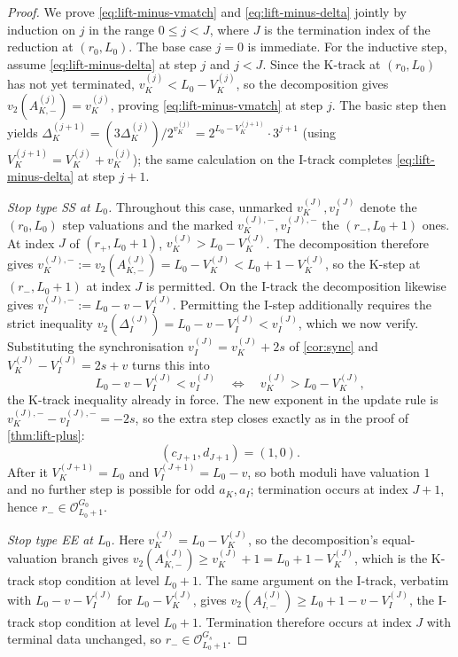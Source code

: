 \documentclass[11pt,reqno]{amsart}
\newcommand{\Obs}{\mathcal{O}}
\newcommand{\Vk}{V_{K}}
\newcommand{\Vi}{V_{I}}
\newcommand{\vk}{v_{K}}
\newcommand{\vi}{v_{I}}
\newcommand{\vtwo}{v_{2}}
\begin{document}
\begin{proof}
We prove \eqref{eq:lift-minus-vmatch} and \eqref{eq:lift-minus-delta} jointly
by induction on $j$ in the range $0 \le j < J$, where $J$ is the termination
index of the reduction at $(r_0, L_0)$. The base case $j = 0$ is immediate.
For the inductive step, assume \eqref{eq:lift-minus-delta} at step $j$ and
$j < J$. Since the K-track at $(r_0, L_0)$ has not yet terminated,
$\vk^{(j)} < L_0 - \Vk^{(j)}$, so the decomposition gives
$\vtwo(A_{K,-}^{(j)}) = \vk^{(j)}$, proving \eqref{eq:lift-minus-vmatch} at
step $j$. The basic step then yields
$\Delta_K^{(j+1)} = (3 \Delta_K^{(j)})/2^{\vk^{(j)}} = 2^{L_0 - \Vk^{(j+1)}} \cdot 3^{j+1}$
(using $\Vk^{(j+1)} = \Vk^{(j)} + \vk^{(j)}$); the same calculation on the
I-track completes \eqref{eq:lift-minus-delta} at step $j+1$.

\emph{Stop type SS at $L_0$.} Throughout this case, unmarked $\vk^{(J)},
\vi^{(J)}$ denote the $(r_0, L_0)$ step valuations and the marked
$\vk^{(J),-}, \vi^{(J),-}$ the $(r_-, L_0+1)$ ones. At index $J$ of
$(r_+, L_0+1)$, $\vk^{(J)} > L_0 - \Vk^{(J)}$. The decomposition therefore gives
$\vk^{(J),-} := \vtwo(A_{K,-}^{(J)}) = L_0 - \Vk^{(J)} < L_0 + 1 - \Vk^{(J)}$,
so the K-step at $(r_-, L_0+1)$ at index $J$ is permitted. On the I-track the
decomposition likewise gives $\vi^{(J),-} := L_0 - v - \Vi^{(J)}$. Permitting
the I-step additionally requires the strict inequality
$\vtwo(\Delta_I^{(J)}) = L_0 - v - \Vi^{(J)} < \vi^{(J)}$, which we now verify.
Substituting the
synchronisation $\vi^{(J)} = \vk^{(J)} + 2s$ of \cref{cor:sync} and
$\Vk^{(J)} - \Vi^{(J)} = 2s + v$ turns this into
\[
L_0 - v - \Vi^{(J)} < \vi^{(J)}
\quad\Longleftrightarrow\quad
\vk^{(J)} > L_0 - \Vk^{(J)},
\]
the K-track inequality already in force. The new exponent in the
update rule is $\vk^{(J),-} - \vi^{(J),-} = -2s$, so the extra step closes
exactly as in the proof of \cref{thm:lift-plus}:
\[
(c_{J+1}, d_{J+1}) = (1, 0).
\]
After it $\Vk^{(J+1)} = L_0$ and
$\Vi^{(J+1)} = L_0 - v$, so both moduli have valuation $1$ and no further
step is possible for odd $a_K, a_I$; termination occurs at index $J + 1$,
hence $r_- \in \Obs_{L_0+1}^{G_0}$.

\emph{Stop type EE at $L_0$.} Here $\vk^{(J)} = L_0 - \Vk^{(J)}$, so the
decomposition's equal-valuation branch gives
$\vtwo(A_{K,-}^{(J)}) \ge \vk^{(J)} + 1 = L_0 + 1 - \Vk^{(J)}$, which is the
K-track stop condition at level $L_0+1$. The same argument on the I-track,
verbatim with $L_0 - v - \Vi^{(J)}$ for $L_0 - \Vk^{(J)}$, gives
$\vtwo(A_{I,-}^{(J)}) \ge L_0 + 1 - v - \Vi^{(J)}$, the I-track stop
condition at level $L_0+1$. Termination therefore occurs at index $J$ with
terminal data unchanged, so $r_- \in \Obs_{L_0+1}^{G_s}$. \qedhere
\end{proof}
\end{document}
